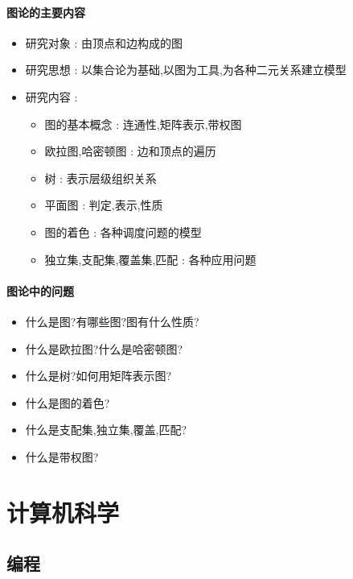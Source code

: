 \documentclass[UTF8,12pt]{ctexbook}
\begin{document}
{{{{  \subsubsection{图论的主要内容}{
    \begin{itemize}
      \item 研究对象 : 由顶点和边构成的图
      \item 研究思想 : 以集合论为基础,以图为工具,为各种二元关系建立模型
      \item 研究内容 : \begin{itemize}
              \item 图的基本概念 : 连通性,矩阵表示,带权图
              \item 欧拉图,哈密顿图 : 边和顶点的遍历
              \item 树 : 表示层级组织关系
              \item 平面图 : 判定,表示,性质
              \item 图的着色 : 各种调度问题的模型
              \item 独立集,支配集,覆盖集,匹配 : 各种应用问题
            \end{itemize}
    \end{itemize}
  }%

  \subsubsection{图论中的问题}{
    \begin{itemize}
      \item 什么是图?有哪些图?图有什么性质?
      \item 什么是欧拉图?什么是哈密顿图?
      \item 什么是树?如何用矩阵表示图?
      \item 什么是图的着色?
      \item 什么是支配集,独立集,覆盖,匹配?
      \item 什么是带权图?
    \end{itemize}
  }%

}%

}%

}%

\chapter{计算机科学}{

  \section{编程}{


}}}
\end{document}
